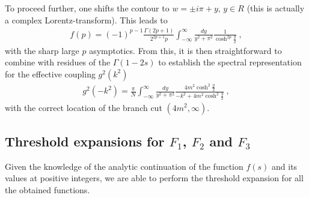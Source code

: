 \documentclass[a4paper,11pt]{article}
\begin{document}
To proceed further, one shifts the contour to $w=\pm i\pi+y$, $y\in R$ (this is actually a complex Lorentz-transform). This leads to
\begin{align}
f(p)=(-1)^{p-1}\frac{\Gamma(2p+1)}{2^{2p+1}p}\int_{-\infty}^{\infty}\frac{dy}{y^2+\pi^2}\frac{1}{ \cosh^{2p} \frac{y}{2}} \ ,
\end{align}
with the sharp large $p$ asymptotics. From this, it is then straightforward to combine with residues of the $\Gamma(1-2s)$ to establish the spectral representation for the effective coupling $g^2(k^2)$
\begin{align}
g^2(-k^2)=\frac{\pi}{N}\int_{-\infty}^{\infty}\frac{dy}{y^2+\pi^2}\frac{4m^2\cosh^2 \frac{y}{2}}{-k^2+4m^2\cosh^2 \frac{y}{2}} \ ,
\end{align}
with the correct location of the branch cut $(4m^2,\infty)$. 


\subsection{Threshold expansions for $F_1$, $F_2$ and $F_3$}

Given the knowledge of the analytic continuation of the function $f(s)$ and its values at positive integers, we are able to perform the threshold expansion for all the obtained functions. 
\end{document}
